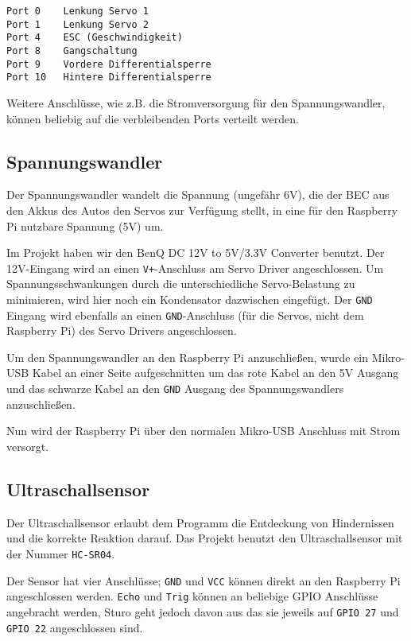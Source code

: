 \documentclass[a4paper,10pt]{scrartcl}
\begin{document}
    \begin{lstlisting}
Port 0    Lenkung Servo 1
Port 1    Lenkung Servo 2
Port 4    ESC (Geschwindigkeit)
Port 8    Gangschaltung
Port 9    Vordere Differentialsperre
Port 10   Hintere Differentialsperre
    \end{lstlisting}

    Weitere Anschlüsse, wie z.B. die Stromversorgung für den Spannungswandler, können beliebig auf
    die verbleibenden Ports verteilt werden.

  \subsection{Spannungswandler}

    Der Spannungswandler wandelt die Spannung (ungefähr 6V), die der BEC aus den Akkus des Autos den
    Servos zur Verfügung stellt, in eine für den Raspberry Pi nutzbare Spannung (5V) um.

    Im Projekt haben wir den BenQ DC 12V to 5V/3.3V Converter benutzt.
    Der 12V-Eingang wird an einen \lstinline{V+}-Anschluss am Servo Driver angeschlossen.
    Um Spannungsschwankungen durch die unterschiedliche Servo-Belastung zu minimieren, wird hier
    noch ein Kondensator dazwischen eingefügt.
    Der \lstinline{GND} Eingang wird ebenfalls an einen \lstinline{GND}-Anschluss (für die Servos,
    nicht dem Raspberry Pi) des Servo Drivers angeschlossen.

    Um den Spannungswandler an den Raspberry Pi anzuschließen, wurde ein Mikro-USB Kabel an einer
    Seite aufgeschnitten um das rote Kabel an den 5V Ausgang und das schwarze Kabel an den
    \lstinline{GND} Ausgang des Spannungswandlers anzuschließen.

    Nun wird der Raspberry Pi über den normalen Mikro-USB Anschluss mit Strom versorgt.

  \subsection{Ultraschallsensor}

    Der Ultraschallsensor erlaubt dem Programm die Entdeckung von Hindernissen und die korrekte
    Reaktion darauf.
    Das Projekt benutzt den Ultraschallsensor mit der Nummer \lstinline{HC-SR04}.

    Der Sensor hat vier Anschlüsse;
    \lstinline{GND} und \lstinline{VCC} können direkt an den Raspberry Pi angeschlossen werden.
    \lstinline{Echo} und \lstinline{Trig} können an beliebige GPIO Anschlüsse angebracht werden,
    Sturo geht jedoch davon aus das sie jeweils auf \lstinline{GPIO 27} und \lstinline{GPIO 22}
    angeschlossen sind.
\end{document}
